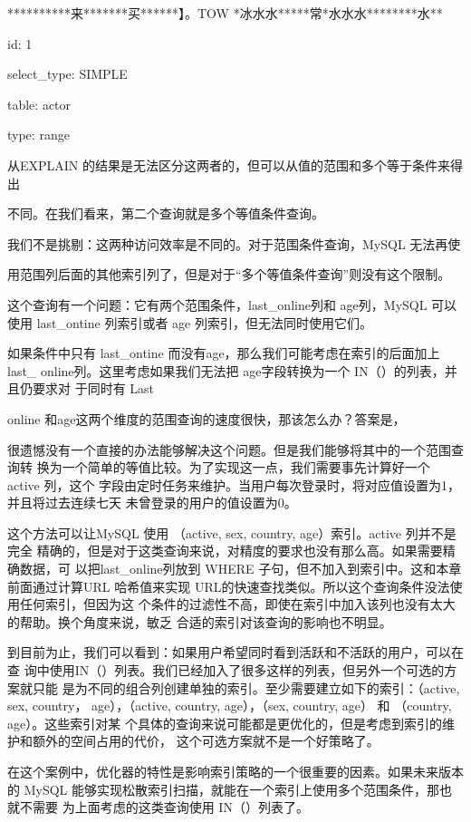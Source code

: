 **********来*******买******】。TOW *冰水水*****常*水水水********水**

id: 1

select\_type: SIMPLE

table: actor

type: range

从EXPLAIN 的结果是无法区分这两者的，但可以从值的范围和多个等于条件来得出

不同。在我们看来，第二个查询就是多个等值条件查询。

我们不是挑剔：这两种访问效率是不同的。对于范围条件查询，MySQL 无法再使

用范围列后面的其他索引列了，但是对于“多个等值条件查询”则没有这个限制。

这个查询有一个问题：它有两个范围条件，last\_online列和 age列，MySQL 可以使用
last\_ontine 列索引或者 age 列索引，但无法同时使用它们。

如果条件中只有 last\_ontine 而没有age，那么我们可能考虑在索引的后面加上last\_
online列。这里考虑如果我们无法把 age字段转换为一个 IN（）的列表，并且仍要求对
于同时有 Last

online 和age这两个维度的范围查询的速度很快，那该怎么办？答案是，

很遗憾没有一个直接的办法能够解决这个问题。但是我们能够将其中的一个范围查询转
换为一个简单的等值比较。为了实现这一点，我们需要事先计算好一个 active 列，这个
字段由定时任务来维护。当用户每次登录时，将对应值设置为1，并且将过去连续七天
未曾登录的用户的值设置为0。

这个方法可以让MySQL 使用 （active, sex, country, age）索引。active 列并不是完全
精确的，但是对于这类查询来说，对精度的要求也没有那么高。如果需要精确数据，可
以把last\_online列放到 WHERE 子句，但不加入到索引中。这和本章前面通过计算URL
哈希值来实现 URL的快速查找类似。所以这个查询条件没法使用任何索引，但因为这
个条件的过滤性不高，即使在索引中加入该列也没有太大的帮助。换个角度来说，敏乏
合适的索引对该查询的影响也不明显。

到目前为止，我们可以看到：如果用户希望同时看到活跃和不活跃的用户，可以在查
询中使用IN（）列表。我们已经加入了很多这样的列表，但另外一个可选的方案就只能
是为不同的组合列创建单独的索引。至少需要建立如下的索引：（active, sex, country，
age），（active, country, age），（sex, country, age） 和 （country, age）。这些索引对某
个具体的查询来说可能都是更优化的，但是考虑到索引的维护和额外的空间占用的代价，
这个可选方案就不是一个好策略了。

在这个案例中，优化器的特性是影响索引策略的一个很重要的因素。如果未来版本的
MySQL 能够实现松散索引扫描，就能在一个索引上使用多个范围条件，那也就不需要
为上面考虑的这类查询使用 IN（）列表了。

